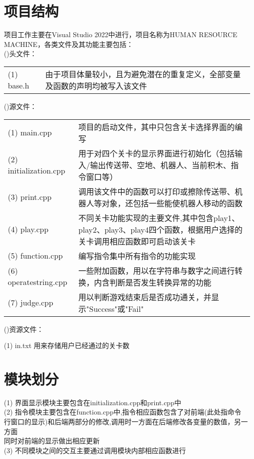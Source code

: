 \documentclass{report}
\begin{document}
    \section{项目结构}
    项目工作主要在Visual Studio 2022中进行，项目名称为HUMAN RESOURCE MACHINE，各类文件及其功能主要包括：\vspace{0.5em}\\
    (\uppercase\expandafter{})头文件：\\
    \begin{tabularx}{1\textwidth}{lX}
    (1) base.h  \hspace*{6.8em}& 由于项目体量较小，且为避免潜在的重复定义，全部变量及函数的声明均被写入该文件
    \end{tabularx}\vspace{0.5em}
    (\uppercase\expandafter{})源文件：\vspace{0.3em}\\
    \renewcommand{\arraystretch}{1.25}
    \begin{tabularx}{1\textwidth}{lX}
    (1) main.cpp & 项目的启动文件，其中只包含关卡选择界面的编写\\
    (2) initialization.cpp & 用于对四个关卡的显示界面进行初始化（包括输入/输出传送带、空地、机器人、当前积木、指令窗口等）\\
    (3) print.cpp & 调用该文件中的函数可以打印或擦除传送带、机器人等对象，还包括一些能使机器人移动的函数\\
    (4) play.cpp & 不同关卡功能实现的主要文件,其中包含play1、play2、play3、play4四个函数，根据用户选择的关卡调用相应函数即可启动该关卡\\
    (5) function.cpp & 编写指令集中所有指令的功能实现\\
    (6) operatestring.cpp \qquad\qquad& 一些附加函数，用以在字符串与数字之间进行转换，内含判断是否发生转换异常的功能\\
    (7) judge.cpp & 用以判断游戏结束后是否成功通关，并显示"Success"或"Fail"
    \end{tabularx}\vspace{0.8em}
    (\uppercase\expandafter{})资源文件：\par
    (1) in.txt \hspace{6.6em} 用来存储用户已经通过的关卡数
    \section{模块划分}\noindent
    (1) 界面显示模块主要包含在initialization.cpp和print.cpp中\\
    (2) 指令模块主要包含在function.cpp中,指令相应函数包含了对前端(此处指命令\\\hspace*{1.7em}行窗口的显示)和后端两部分的修改,调用时一方面在后端修改各变量的数值，另一方面\\\hspace*{1.7em}同时对前端的显示做出相应更新\\
    (3) 不同模块之间的交互主要通过调用模块内部相应函数进行
\end{document}
